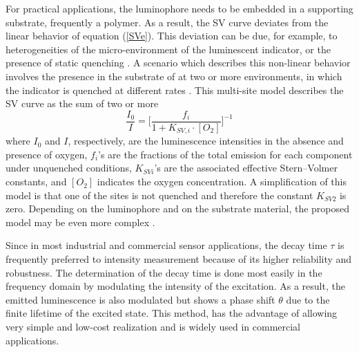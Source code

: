 \documentclass[9pt,twocolumn,twoside,pdftex]{optica}
\begin{document}
For practical applications, the luminophore needs to be embedded in a supporting substrate, frequently a polymer. As a result, the SV curve deviates from the linear behavior of equation (\ref{SVe}). This deviation can be due, for example, to heterogeneities of the micro-environment of the luminescent indicator, or the presence of static quenching \cite{Wang2014}. A scenario which describes this non-linear behavior involves the presence in the substrate of at two or more environments, in which the indicator is quenched at different rates \cite{Carraway1991,Demas1995}. This multi-site model describes the SV curve as the sum of two or more
\begin{equation}
\frac{I_0}{I}=\bigg[
\frac{f_i}{1+K_{SV,i} \cdot \left[O_2\right]}
\bigg]^{-1}
\label{SVe2}
\end{equation}
where $I_0$ and $I$, respectively, are the luminescence intensities in the absence and presence of oxygen, $f_i$'s are the fractions of the total emission for each component under unquenched conditions, $K_{SVi}$'s are the associated effective Stern–Volmer constants, and $\left[O_2\right]$ indicates the oxygen concentration. A simplification of this model is that one of the sites is not quenched and therefore the constant $K_{SV2}$ is zero.
 Depending on the luminophore and on the substrate material, the proposed model may be even more complex \cite{Demas1995,Hartmann1995,Mills1999}.

Since in most industrial and commercial sensor applications, the decay time $\tau$ is frequently preferred to intensity measurement because of its higher reliability and robustness. The determination of the decay time is done most easily in the frequency domain by modulating the intensity of the excitation.  As a result, the emitted luminescence is also modulated but shows a phase shift $\theta$ due to the finite lifetime of the excited state. This method, has the advantage of allowing very simple and low-cost realization and is widely used in commercial applications.
\end{document}
